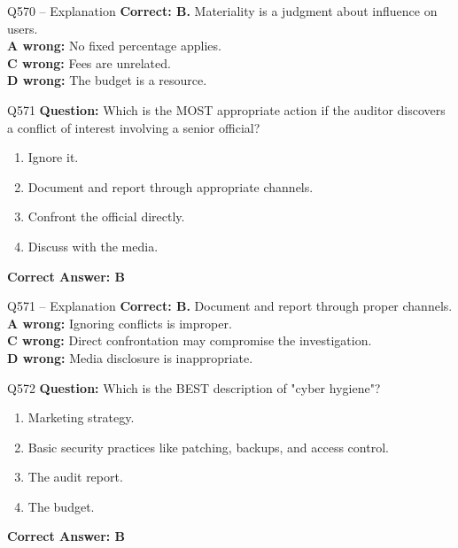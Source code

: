 \documentclass[aspectratio=169,10pt]{beamer}
\begin{document}
	\begin{frame}[t]{Q570 -- Explanation}
		\small
		\textbf{Correct: B.} Materiality is a judgment about influence on users. \\[4pt]
		\textbf{A wrong:} No fixed percentage applies. \\[2pt]
		\textbf{C wrong:} Fees are unrelated. \\[2pt]
		\textbf{D wrong:} The budget is a resource.
	\end{frame}
	
	\begin{frame}[t]{Q571}
		\small
		\textbf{Question:} Which is the MOST appropriate action if the auditor discovers a conflict of interest involving a senior official?
		\begin{enumerate}[label=\Alph*.,itemsep=1pt,topsep=2pt]
			\item Ignore it.
			\item Document and report through appropriate channels.
			\item Confront the official directly.
			\item Discuss with the media.
		\end{enumerate}
		\vspace{4pt}
		\textbf{Correct Answer: B}
	\end{frame}
	
	\begin{frame}[t]{Q571 -- Explanation}
		\small
		\textbf{Correct: B.} Document and report through proper channels. \\[4pt]
		\textbf{A wrong:} Ignoring conflicts is improper. \\[2pt]
		\textbf{C wrong:} Direct confrontation may compromise the investigation. \\[2pt]
		\textbf{D wrong:} Media disclosure is inappropriate.
	\end{frame}
	
	\begin{frame}[t]{Q572}
		\small
		\textbf{Question:} Which is the BEST description of "cyber hygiene"?
		\begin{enumerate}[label=\Alph*.,itemsep=1pt,topsep=2pt]
			\item Marketing strategy.
			\item Basic security practices like patching, backups, and access control.
			\item The audit report.
			\item The budget.
		\end{enumerate}
		\vspace{4pt}
		\textbf{Correct Answer: B}
	\end{frame}
	
\end{document}

